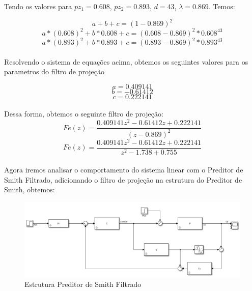 \documentclass[a4paper,12pt]{article}
\begin{document}
Tendo os valores para \(pz_1 = 0.608\), \(pz_2 = 0.893\), \(d = 43\), \(\lambda = 0.869\). Temos:


\begin{equation}
a + b + c = (1 - 0.869)^2
\end{equation}
\begin{equation}
a * (0.608)^2 + b * 0.608  + c = (0.608 - 0.869)^2 * 0.608^{43}
\end{equation}
\begin{equation}
a * (0.893)^2 + b * 0.893  + c = (0.893 - 0.869)^2 * 0.893^{43}
\end{equation}\\

Resolvendo o sistema de equações acima, obtemos os seguintes valores para os parametros do filtro de projeção

\begin{equation}
a =  0.409141
\end{equation}
\begin{equation}
b = -0.61412
\end{equation}
\begin{equation}
c = 0.222141
\end{equation}\\

Dessa forma, obtemos o seguinte filtro de projeção:\\

\begin{equation}
Fe(z) = \frac{0.409141z^2 - 0.61412z + 0.222141}{(z-0.869)^2}
\end{equation}
\begin{equation}
Fe(z) = \frac{0.409141z^2 - 0.61412z + 0.222141}{z^2 - 1.738 + 0.755}
\end{equation}\\

Agora iremos analisar o comportamento do sistema linear com o Preditor de Smith Filtrado, adicionando o filtro de projeção na estrutura do Preditor de Smith, obtemos:

\begin{figure}[h]
    \centering
    \includegraphics[width=0.9\linewidth]{image2.png}
    \caption{Estrutura Preditor de Smith Filtrado}
    \label{fig:enter-label}
\end{figure}
\end{document}
